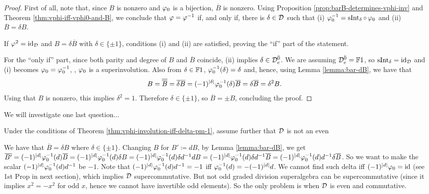 \documentclass{amsbook}
\begin{document}
\begin{proof}
    First of all, note that, since $B$ is nonzero and $\varphi_0$ is a bijection, $\overline {B}$ is nonzero.
    Using Proposition \ref{prop:barB-determines-vphi-inv} and Theorem \ref{thm:vphi-iff-vphi0-and-B}, we conclude that $\varphi = \varphi^{-1}$ if, and only if, there is $\delta \in \mathcal{D}$ such that (i) $\varphi_0^{-1} = \operatorname{sInt}_\delta \circ \,\varphi_0$ and (ii) $\overline {B} = \delta B$. 
    
    If $\varphi^2 =\operatorname{id}_{\mathcal{D}}$ and $B = \delta \overline{B}$ with $\delta \in \{\pm 1\}$, conditions (i) and (ii) are satisfied, proving the ``if'' part of the statement. 

    For the ``only if'' part, since both parity and degree of $B$ and $\overline {B}$ coincide, (ii) implies $\delta \in \mathcal{D}^{\bar0}_e$. 
    We are assuming $\mathcal{D}^{\bar0}_e = \mathbb{F} 1$, so $\operatorname{sInt}_\delta = \operatorname{id}_{\mathcal{D}}$ and (i) becomes $\varphi_0 = \varphi_0^{-1}$, \ie, $\varphi_0$ is a superinvolution. 
    Also from $\delta \in \mathbb{F} 1$, $\varphi_0^{-1}(\delta) = \delta$ and, hence, using Lemma \ref{lemma:bar-dB}, we have that
    \[
        B = \overline {\overline B} = \overline {\delta B} = (-1)^{|\delta|} \varphi_0^{-1}(\delta) \overline B= \delta \overline B = \delta^2 B.
    \]
    Using that $B$ is nonzero, this implies $\delta^2 = 1$. 
    Therefore $\delta \in \{ \pm 1 \}$, so $\overline B = \pm B$, concluding the proof. 
\end{proof}

We will investigate one last question...

\begin{cor}
    Under the conditions of Theorem \ref{thm:vphi-involution-iff-delta-pm-1}, assume further that $\mathcal{D}$ is not an even 
\end{cor}

We have that $\overline B = \delta B $ where $\delta \in \{\pm 1\}$. 
Changing $B$ for $B' \coloneqq dB$, by Lemma \ref{lemma:bar-dB}, we get $\overline{B'} = (-1)^{|d|} \varphi_0^{-1} (d) \overline B = (-1)^{|d|} \varphi_0^{-1} (d) \delta B = (-1)^{|d|} \varphi_0^{-1} (d) \delta d^{-1} d B = (-1)^{|d|} \varphi_0^{-1} (d) \delta d^{-1} \overline B = (-1)^{|d|} \varphi_0^{-1} (d) d^{-1} \delta \overline B$.
So we want to make the scalar $(-1)^{|d|} \varphi_0^{-1} (d) d^{-1}$ be $-1$. 
Note that $(-1)^{|d|} \varphi_0^{-1} (d) d^{-1} = -1$ iff $\varphi_0^{-1} (d) = - (-1)^{|d|} d$. 
We cannot find such delta iff $ (-1)^{|d|} \varphi_0 = \operatorname{id}$ (see 1st Prop in next section), which implies $\mathcal{D}$ supercommutative. But not odd graded division superalgebra can be supercommutative (since it implies $x^2 = -x^2$ for odd $x$, hence we cannot have invertible odd elements). So the only problem is when $\mathcal{D}$ is even and commutative. 
\end{document}
